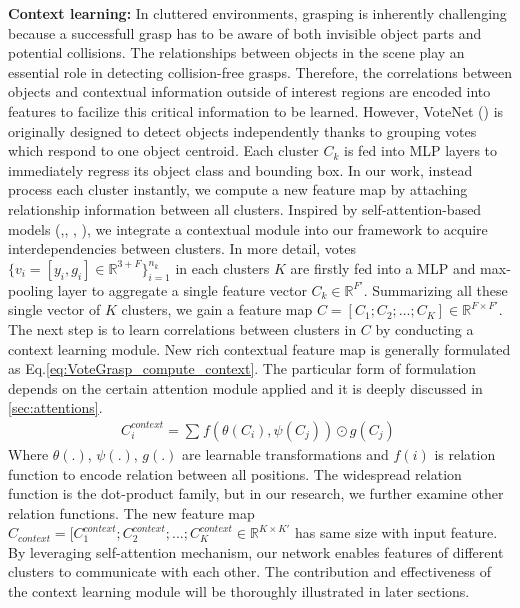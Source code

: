 \textbf{Context learning:} In cluttered environments, grasping is inherently challenging because a successfull grasp has to be aware of both invisible object parts and potential collisions. The relationships between objects in the scene play an essential role in detecting collision-free grasps. Therefore, the correlations between objects and contextual information outside of interest regions are encoded into features to facilize this critical information to be learned. However, VoteNet (\textcolor{cyan}{\cite{qi2019deep}}) is originally designed to detect objects independently thanks to grouping votes which respond to one object centroid. Each cluster $C_k$ is fed into MLP layers to immediately regress its object class and bounding box. In our work, instead process each cluster instantly, we compute a new feature map by attaching relationship information between all clusters. Inspired by self-attention-based models (\textcolor{cyan}{\cite{vaswani2017attention}},\textcolor{cyan}{\cite{xie2018attentional}}, \textcolor{cyan}{\cite{wang2018non}}, \textcolor{cyan}{\cite{fu2019dual}}), we integrate a contextual module into our framework to acquire interdependencies between clusters. In more detail, votes $\lbrace v_i = [y_i,g_i] \in \mathbb{R}^{3+F} \rbrace ^{n_k}_{i=1}$ in each clusters $K$ are firstly fed into a MLP and max-pooling layer to aggregate a single feature vector $C_k \in \mathbb{R}^{F'}$. Summarizing all these single vector of $K$ clusters, we gain a feature map $C=[C_1;C_2;...;C_K] \in \mathbb{R}^{F \times F'}$. The next step is to learn correlations between clusters in $C$ by conducting a context learning module. New rich contextual feature map is generally formulated as Eq.\ref{eq:VoteGrasp_compute_context}. The particular form of formulation depends on the certain attention module applied and it is deeply discussed in \ref{sec:attentions}.
\begin{align}
\label{eq:VoteGrasp_compute_context}
C^{context}_i = \sum_{}^{} f(\theta(C_i), \psi(C_j)) \odot g(C_j) \
\end{align}
Where $\theta(.)$, $\psi(.)$, $g(.)$ are learnable transformations and $f(i)$ is relation function to encode relation between all positions. The widespread relation function is the dot-product family, but in our research, we further examine other relation functions. The new feature map $C_{context} = [C^{context}_1; C^{context}_2;...;C^{context}_K \in \mathbb{R}^{K \times K'}$ has same size with input feature. By leveraging self-attention mechanism, our network enables features of different clusters to communicate with each other. The contribution and effectiveness of the context learning module will be thoroughly illustrated in later sections.


